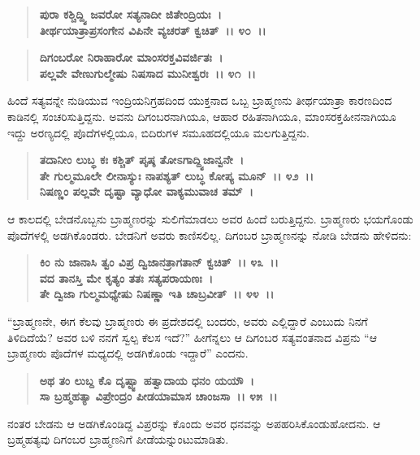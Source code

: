 \begin{verse}
\textbf{ಪುರಾ ಕಶ್ಚಿದ್ದ್ವಿ ಜವರೋ ಸತ್ಯನಾದೀ ಜಿತೇಂದ್ರಿಯಃ~।}\\\textbf{ತೀರ್ಥಯಾತ್ರಾಪ್ರಸಂಗೇನ ವಿಪಿನೇ ವ್ಯಚರತ್ ಕ್ವಚಿತ್~।। ೪೦~।। }
\end{verse}

\begin{verse}
\textbf{ದಿಗಂಬರೋ ನಿರಾಹಾರೋ ಮಾಂಸರಕ್ತವಿವರ್ಜಿತಃ~।}\\\textbf{ಪಲ್ಲವೇ ವೇಣುಗುಲ್ಮೇಷು ನಿಷಸಾದ ಮುನೀಶ್ವರಃ~।। ೪೧~।।}
\end{verse}

ಹಿಂದೆ ಸತ್ಯವನ್ನೇ ನುಡಿಯುವ ಇಂದ್ರಿಯನಿಗ್ರಹದಿಂದ ಯುಕ್ತನಾದ ಒಬ್ಬ ಬ್ರಾಹ್ಮಣನು ತೀರ್ಥಯಾತ್ರಾ ಕಾರಣದಿಂದ ಕಾಡಿನಲ್ಲಿ ಸಂಚರಿಸುತ್ತಿದ್ದನು. ಅವನು ದಿಗಂಬರನಾಗಿಯೂ, ಆಹಾರ ರಹಿತನಾಗಿಯೂ, ಮಾಂಸರಕ್ತಹೀನನಾಗಿಯೂ ಇದ್ದು ಅರಣ್ಯದಲ್ಲಿ ಪೊದೆಗಳಲ್ಲಿಯೂ, ಬಿದಿರುಗಳ ಸಮೂಹದಲ್ಲಿಯೂ ಮಲಗುತ್ತಿದ್ದನು.

\begin{verse}
\textbf{ತದಾನೀಂ ಲುಬ್ಧ ಕಃ ಕಶ್ಚಿತ್ ಪೃಷ್ಠ ತೋಽಗಾದ್ದ್ವಿಜಾನ್ವನೇ~।}\\\textbf{ತೇ ಗುಲ್ಮಮೂಲೇ ಲೀನಾಸ್ಯುಃ ನಾಪಶ್ಯತ್ ಲುಬ್ಧ ಕೋಪ್ಯ ಮೂನ್~।। ೪೨~।।}\\\textbf{ನಿಷಣ್ಣಂ ಪಲ್ಲವೇ ದೃಷ್ಟಾ ವ್ಯಾಧೋ ವಾಕ್ಯಮುವಾಚ ತಮ್~।}
\end{verse}

ಆ ಕಾಲದಲ್ಲಿ ಬೇಡನೊಬ್ಬನು ಬ್ರಾಹ್ಮಣರನ್ನು ಸುಲಿಗೆಮಾಡಲು ಅವರ ಹಿಂದೆ ಬರುತ್ತಿದ್ದನು. ಬ್ರಾಹ್ಮಣರು ಭಯಗೊಂಡು ಪೊದೆಗಳಲ್ಲಿ ಅಡಗಿಕೊಂಡರು. ಬೇಡನಿಗೆ ಅವರು ಕಾಣಿಸಲಿಲ್ಲ. ದಿಗಂಬರ ಬ್ರಾಹ್ಮಣನನ್ನು ನೋಡಿ ಬೇಡನು ಹೇಳಿದನು:

\begin{verse}
\textbf{ಕಿಂ ನು ಜಾನಾಸಿ ತ್ವಂ ವಿಪ್ರ ದ್ವಿಜಾನತ್ರಾಗತಾನ್ ಕ್ವಚಿತ್~।। ೪೩~।।}\\\textbf{ವದ ತಾನಸ್ತಿ ಮೇ ಕೃತ್ಯಂ ತತಃ ಸತ್ಯಪರಾಯಣಃ~। }\\\textbf{ತೇ ದ್ವಿಜಾ ಗುಲ್ಮಮಧ್ಯೇಷು ನಿಷಣ್ಣಾ ಇತಿ ಚಾಬ್ರವೀತ್~।। ೪೪~।।}
\end{verse}

“ಬ್ರಾಹ್ಮಣನೇ, ಈಗ ಕೆಲವು ಬ್ರಾಹ್ಮಣರು ಈ ಪ್ರದೇಶದಲ್ಲಿ ಬಂದರು, ಅವರು ಎಲ್ಲಿದ್ದಾರೆ ಎಂಬುದು ನಿನಗೆ ತಿಳಿದಿದೆಯೆ? ಅವರ ಬಳಿ ನನಗೆ ಸ್ವಲ್ಪ ಕೆಲಸ ಇದೆ?” ಹೀಗೆನ್ನಲು ಆ ದಿಗಂಬರ ಸತ್ಯವಂತನಾದ ವಿಪ್ರನು ``ಆ ಬ್ರಾಹ್ಮಣರು ಪೊದೆಗಳ ಮಧ್ಯದಲ್ಲಿ ಅಡಗಿಕೊಂಡು ಇದ್ದಾರೆ” ಎಂದನು.

\begin{verse}
\textbf{ಅಥ ತಂ ಲುಬ್ದ ಕೊ ದೃಷ್ಟ್ವಾ ಹತ್ವಾದಾಯ ಧನಂ ಯಯೌ~।}\\\textbf{ಸಾ ಬ್ರಹ್ಮಹತ್ಯಾ ವಿಪ್ರೇಂದ್ರಂ ಪೀಡಯಾಮಾಸ ಚಾಂಜಸಾ~।। ೪೫~।।}
\end{verse}

ನಂತರ ಬೇಡನು ಆ ಅಡಗಿಕೊಂಡಿದ್ದ ವಿಪ್ರರನ್ನು ಕೊಂದು ಅವರ ಧನವನ್ನು ಅಪಹರಿಸಿಕೊಂಡುಹೋದನು. ಆ ಬ್ರಹ್ಮಹತ್ಯವು ದಿಗಂಬರ ಬ್ರಾಹ್ಮಣನಿಗೆ ಪೀಡೆಯನ್ನುಂಟುಮಾಡಿತು.

